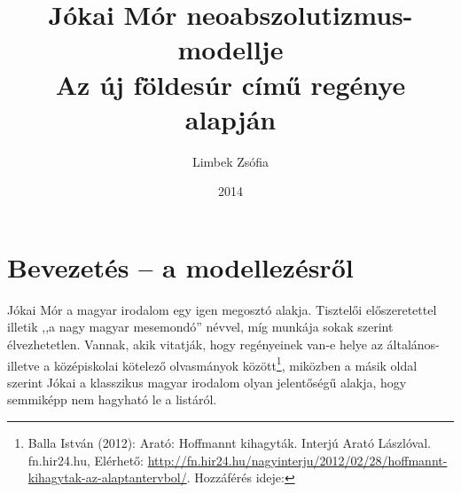 \documentclass[a4paper,12pt]{thesis-ekf}
\begin{document}
    \title{Jókai Mór neoabszolutizmus-modellje\\Az új földesúr című regénye alapján}
    \author{Limbek Zsófia}
    \date{2014}

    \maketitle
    \tableofcontents


    \chapter{Bevezetés – a modellezésről}\label{ch:bevezetes--a-modellezesrol}

    Jókai Mór a magyar irodalom egy igen megosztó alakja. 
    Tisztelői előszeretettel illetik ,,a nagy magyar mesemondó'' névvel, míg munkája sokak szerint élvezhetetlen.
    Vannak, akik vitatják, hogy regényeinek van-e helye az általános- illetve a középiskolai kötelező olvasmányok 
        között\footnote{Balla István (2012): Arató: Hoffmannt kihagyták. Interjú Arató Lászlóval.
            fn.hir24.hu, 
            Elérhető: \url{http://fn.hir24.hu/nagyinterju/2012/02/28/hoffmannt-kihagytak-az-alaptantervbol/}.
            Hozzáférés ideje: },
        miközben a másik oldal szerint Jókai a klasszikus magyar irodalom olyan jelentőségű alakja, hogy semmiképp
        nem hagyható le a listáról.
\end{document}
